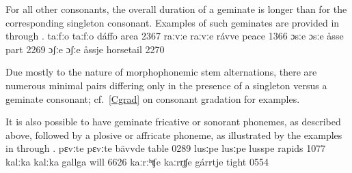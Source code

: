For all other consonants, the overall duration of a geminate is longer than for the corresponding singleton consonant. Examples of such geminates are provided in  through .
	{taː{fː}o}	{taː{fː}o}	{dáffo}	{area\BS{}}		{2367}%
	{raː{vː}e}	{raː{vː}e}	{rávve}	{peace\BS{}}		{1366}%
	{ɔ{sː}e}	{ɔ{sː}e}	{åsse}	{part\BS{}}	{2269}
	{ɔ{ʃː}e}	{ɔ{ʃː}e}	{åssje}	{horsetail\BS{}}	{2270}

Due mostly to the nature of morphophonemic stem alternations, there are numerous minimal pairs differing only in the presence of a singleton versus a geminate consonant; cf.~\SEC\ref{Cgrad} on consonant gradation for examples. %

It is also possible to have geminate fricative or sonorant phonemes, as described above, followed by a plosive or affricate phoneme, as illustrated by the examples in  through .
	{pɛ{vː}te}	{pɛ{vː}te}	{bävvde}	{table\BS{}}		{0289}%
	{lu{sː}pe}	{lu{sː}pe}	{lusspe}	{rapids\BS{}}		{1077}%
	{ka{lː}ka}	{ka{lː}ka}	{gallga}	{will\BS{}}		{6626}%
	{kaː{rː}ʰʧe}	{kaː{rr̥}ʧe}	{gárrtje}	{tight\BS{}}		{0554}%

